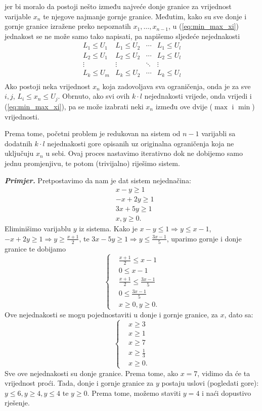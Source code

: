 \documentclass[a4paper, utf8, 11pt, colorlinks]{book}
\begin{document}
 jer bi moralo da postoji nešto između najveće donje granice za vrijednost varijable $x_n$ te njegove najmanje gornje granice. Međutim, kako su sve donje i gornje granice izražene preko nepoznatih $x_1, \ldots, x_{n-1}$,  u (\ref{eq:min_max_xi}) jednakost se ne može samo tako napisati, pa napišemo sljedeće nejednakosti 
 $$\begin{array}{cccc}
       L_1 \leq U_1 & L_1 \leq U_2   &  \cdots   & L_1 \leq U_l \\
       L_2 \leq U_1 & L_2  \leq U_2  &  \cdots   & L_2 \leq U_l \\
       \vdots       &     \vdots     &   \ddots  & \vdots       \\
       L_k \leq U_m &  L_k \leq U_2  &   \cdots  & L_k \leq U_l \\
 \end{array}$$ 
Ako postoji neka vrijednost  $x_n$ koja zadovoljava sva ograničenja, onda je za sve $i,j$, 
$L_i \leq x_n \leq U_j$. Obrnuto, ako svi ovih $k \cdot l$ nejednakosti vrijede, onda vrijedi i (\ref{eq:min_max_xi}), pa se može izabrati neki $x_n$ između ove dvije ($\max$ i $\min$) vrijednosti. 

Prema tome, početni problem je redukovan na sistem od $n-1$ varijabli sa dodatnih  $k \cdot l$ nejednakosti gore opisanih uz originalna ograničenja koja ne uključuju $x_n$ u sebi. Ovaj proces nastavimo iterativno dok ne dobijemo samo jednu promjenjivu, te potom (trivijalno) riješimo sistem. 

\emph{\textbf{Primjer.}} Pretpostavimo da nam je dat sistem nejednačina:
\begin{align*}
	 &x - y \geq 1 \\
	 &-x + 2y \geq 1 \\
	 & 3x + 5y \geq 1 \\
	 & x,y \geq 0.
\end{align*}
Eliminišimo varijablu $y$ iz sistema. Kako je $x-y \leq 1 \Rightarrow y \leq x -1 $, 
$-x + 2y \geq 1 \Rightarrow y \geq \frac{x+1}{2}$, te $ 3x - 5y \geq 1 \Rightarrow y \leq \frac{3x-1}{5}$, uparimo gornje i donje granice te dobijamo 
 $$
 \begin{cases}
 	&\frac{x+1}{2} \leq x-1 \\
 	& 0 \leq x-1 \\
 	& \frac{x+1}{2} \leq \frac{3x-1}{5} \\
 	& 0 \leq \frac{3x-1}{5} \\
 	& x \geq 0, y \geq 0.  	
 \end{cases}
 $$
Ove nejednakosti se mogu pojednostaviti u donje i gornje granice, 
za $x$, dato sa:
$$
\begin{cases}
    &x \geq 3 \\
    & x \geq 1 \\
    & x \geq 7 \\
    & x \geq \frac{1}{3} \\
    & x \geq 0.	
\end{cases}
$$
Sve ove nejednakosti su donje granice. Prema tome, ako $x=7$, vidimo da će ta vrijednost proći. 
Tada, donje i gornje granice za $y$ postaju uslovi (pogledati gore): $y \leq 6, y \geq 4, y \leq 4$ te $y \geq 0$. Prema tome, možemo staviti $y=4$ i naći dopustivo rješenje. 
\end{document}
